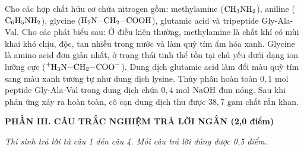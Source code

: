 \documentclass[11pt,a4paper]{article}
\begin{document}
\begin{ex}
Cho các hợp chất hữu cơ chứa nitrogen gồm: methylamine ($\ce{CH3NH2}$), aniline ($\ce{C6H5NH2}$), glycine ($\ce{H2N-CH2-COOH}$), glutamic acid và tripeptide Gly-Ala-Val. Cho các phát biểu sau:
\choiceTF
{\True Ở điều kiện thường, methylamine là chất khí có mùi khai khó chịu, độc, tan nhiều trong nước và làm quỳ tím ẩm hóa xanh.}
{\True Glycine là amino acid đơn giản nhất, ở trạng thái tinh thể tồn tại chủ yếu dưới dạng ion lưỡng cực ($\ce{^+H3N-CH2-COO^-}$).}
{Dung dịch glutamic acid làm đổi màu quỳ tím sang màu xanh tương tự như dung dịch lysine.}
{\True Thủy phân hoàn toàn $0{,}1\text{ mol}$ peptide Gly-Ala-Val trong dung dịch chứa $0{,}4\text{ mol}$ $\ce{NaOH}$ đun nóng. Sau khi phản ứng xảy ra hoàn toàn, cô cạn dung dịch thu được $38{,}7\text{ gam}$ chất rắn khan.}

\end{ex}
\vspace{6pt}
\noindent
{\color{mainGreen}\textbf{\large PHẦN III. CÂU TRẮC NGHIỆM TRẢ LỜI NGẮN (2,0 điểm)}}

\textit{Thí sinh trả lời từ câu 1 đến câu 4. Mỗi câu trả lời đúng được 0,5 điểm.}

\vspace{2pt}
\end{document}
